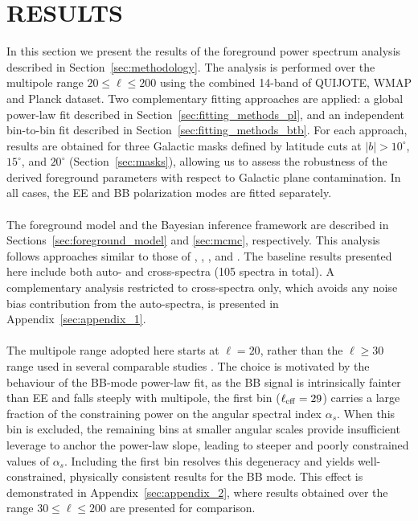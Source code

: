 \section{RESULTS}
\label{sec:results}

In this section we present the results of the foreground power spectrum analysis described in Section~\ref{sec:methodology}. The analysis is performed over the multipole range $20 \leq \ell \leq 200$ using the combined 14-band of QUIJOTE, WMAP and Planck dataset. Two complementary fitting approaches are applied: a global power-law fit described in Section~\ref{sec:fitting_methods_pl}, and an independent bin-to-bin fit described in Section~\ref{sec:fitting_methods_btb}. For each approach, results are obtained for three Galactic masks defined by latitude cuts at $|b| > 10^\circ$, $15^\circ$, and $20^\circ$ (Section~\ref{sec:masks}), allowing us to assess the robustness of the derived foreground parameters with respect to Galactic plane contamination. In all cases, the EE and BB polarization modes are fitted separately.

\paragraph{}

The foreground model and the Bayesian inference framework are described in Sections~\ref{sec:foreground_model} and \ref{sec:mcmc}, respectively. This analysis follows approaches similar to those of \citet{Planck_2018XI}, \citet{Choi_2015}, \citet{Hensley_2022}, and \citet{Martire_2022}. The baseline results presented here include both auto- and cross-spectra (105 spectra in total). A complementary analysis restricted to cross-spectra only, which avoids any noise bias contribution from the auto-spectra, is presented in Appendix~\ref{sec:appendix_1}. 

\paragraph{}

The multipole range adopted here starts at $\ell = 20$, rather than the $\ell \geq 30$ range used in several comparable studies \citep{QUIJOTE_IV, Martire_2022}. The choice is motivated by the behaviour of the BB-mode power-law fit, as the BB signal is intrinsically fainter than EE and falls steeply with multipole, the first bin ($\ell_{\rm eff} = 29$) carries a large fraction of the constraining power on the angular spectral index $\alpha_s$. When this bin is excluded, the remaining bins at smaller angular scales provide insufficient leverage to anchor the power-law slope, leading to steeper and poorly constrained values of $\alpha_s$. Including the first bin resolves this degeneracy and yields well-constrained, physically consistent results for the BB mode. This effect is demonstrated in Appendix~\ref{sec:appendix_2}, where results obtained over the range $30 \leq \ell \leq 200$ are presented for comparison.

